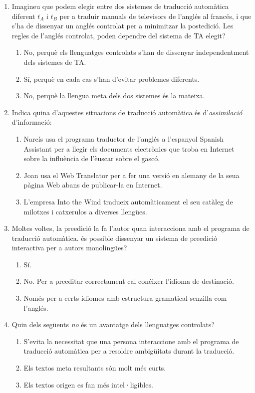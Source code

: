 \begin{enumerate}
\item Imagineu que podem elegir entre dos sistemes de traducció
      automàtica diferent $t_A$ i $t_B$ per a traduir manuals de
      televisors de l'anglés al francés, i que s'ha de dissenyar un
      anglés controlat per a minimitzar la postedició. Les regles
      de l'anglés controlat, poden dependre del sistema de TA elegit?
      \begin{enumerate}
      \item No, perquè els llenguatges controlats s'han de dissenyar
            independentment dels sistemes de TA.
      \item Sí, perquè en cada cas s'han d'evitar problemes
            diferents.
      \item No, perquè la llengua meta dels dos sistemes és la
            mateixa.
      \end{enumerate}

 \item Indica quina d'aquestes situacions de traducció automàtica
 és d'\emph{assimilació} d'informació:
 \begin{enumerate}
 \item Narcís usa el programa traductor de l'anglés a l'espanyol
  Spanish Assistant per a
 llegir els documents electrònics que troba en Internet sobre
 la influència de l'èuscar sobre el gascó.
 \item Joan usa el Web Translator per a fer una versió en
 alemany de la seua pàgina Web abans de publicar-la en
 Internet.
 \item L'empresa Into the Wind tradueix automàticament
 el seu catàleg de
 milotxes i catxerulos a diverses llengües.
 \end{enumerate}

\item Moltes voltes, la preedició la fa l'autor quan interacciona amb el
programa de traducció automàtica. és possible dissenyar un
sistema de preedició interactiva per a autors monolingües?
 \begin{enumerate}
 \item Sí.
 \item No. Per a preeditar correctament cal conéixer l'idioma de
 destinació.
 \item Només per a certs idiomes amb estructura gramatical
 senzilla com l'anglés.
 \end{enumerate}

\item Quin dels següents \emph{no} és un avantatge dels llenguatges
  controlats?
\begin{enumerate}
\item S'evita la necessitat que una persona interaccione amb el programa
  de traducció automàtica per a resoldre ambigüitats durant la traducció.
\item Els textos meta resultants són molt més curts.
\item Els textos origen es fan més intel·ligibles.
\end{enumerate}


\end{enumerate}
